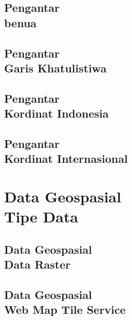 \documentclass{WileySix}
\begin{document}
\chapter[Benua]
{Pengantar\\ benua}



%



\chapter[Garis Khatulistiwa]
{Pengantar\\ Garis Khatulistiwa}



\chapter[Kordinat Indonesia]
{Pengantar\\ Kordinat Indonesia}


\chapter[Kordinat Internasional]
{Pengantar\\ Kordinat Internasional}



\part[Data Geospasial]
{Data Geospasial\\ Tipe Data}


\chapter[Data Raster]
{Data Geospasial\\ Data Raster}



\chapter[Open Geospatial Consortium]
{Data Geospasial\\ Web Map Tile Service}

\end{document}
